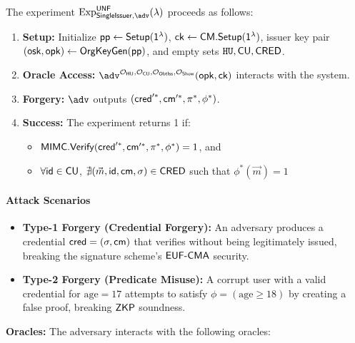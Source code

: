\noindent The experiment $\mathrm{Exp}^{\mathsf{UNF}}_{\mathsf{SingleIssuer}, \adv}(\lambda)$ proceeds as follows:

\begin{enumerate}
    \item \textbf{Setup:} Initialize $\mathsf{pp} \gets \mathsf{Setup}(\mathsf{1^{\lambda}})$, $\mathsf{ck} \gets \mathsf{CM.Setup}(\mathsf{1^{\lambda}})$, issuer key pair $(\mathsf{osk}, \mathsf{opk}) \gets \mathsf{OrgKeyGen}(\mathsf{pp})$, and empty sets $\mathtt{HU}, \mathsf{CU}, \mathsf{CRED}$.
    
    \item \textbf{Oracle Access:} $\adv^{\OHU, \OCU, \OOBTISS, \OSHOW}(\opk, \ck)$ interacts with the system.
    
    \item \textbf{Forgery:} $\adv$ outputs $(\mathsf{cred}'^*, \mathsf{cm}'^*, \pi^*, \phi^*)$.
    
    \item \textbf{Success:} The experiment returns 1 if:
    \begin{itemize}
        \item $\mathsf{MIMC.Verify}(\mathsf{cred}'^*, \mathsf{cm}'^*, \pi^*, \phi^*) = 1$, and
        \item $\forall \mathsf{id} \in \mathsf{CU}$, $\nexists (\vec{m}, \mathsf{id}, \mathsf{cm}, \sigma) \in \mathsf{CRED}$ such that $\phi^*(\vec{m}) = 1$
    \end{itemize}
\end{enumerate}

\paragraph{Attack Scenarios}
\begin{itemize}
    \item \textbf{Type-1 Forgery (Credential Forgery):} An adversary produces a credential $\mathsf{cred} = (\sigma, \mathsf{cm})$ that verifies without being legitimately issued, breaking the signature scheme's $\mathsf{EUF\text{-}CMA}$ security.
    
    \item \textbf{Type-2 Forgery (Predicate Misuse):} A corrupt user with a valid credential for $\text{age} = 17$ attempts to satisfy $\phi=(\text{age} \geq 18)$ by creating a false proof, breaking $\mathsf{ZKP}$ soundness.
\end{itemize}

\noindent \textbf{Oracles:} The adversary interacts with the following oracles:


